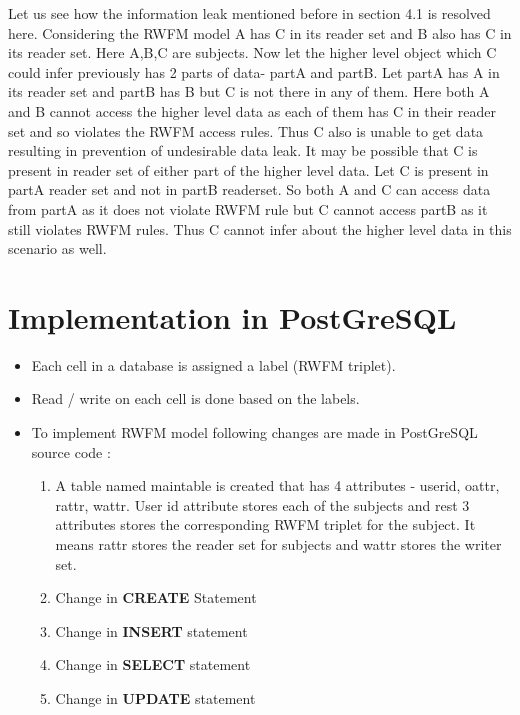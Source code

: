 \documentclass[11pt,a4paper]{report}
\begin{document}
Let us see how the information leak mentioned before in section 4.1 is resolved here. Considering the RWFM model A has C in its reader set and B also has C in its reader set. Here A,B,C are subjects. Now let the higher level object which C could infer previously has 2 parts of data- partA and partB. Let partA has A in its reader set and partB has B but C is not there in any of them. Here both A and B cannot access the higher level data as each of them has C in their reader set and so violates the RWFM access rules. Thus C also is unable to get data resulting in prevention of undesirable data leak. It may be possible that C is present in reader set of either part of the higher level data. Let C is present in partA reader set and not in partB readerset. So both A and C can access data from partA as it does not violate RWFM rule but C cannot access partB as it still violates RWFM rules. Thus C cannot infer about the higher level data in this scenario as well.
    

\section{Implementation in PostGreSQL}
\begin{itemize}
    \item Each cell in a database is assigned a label (RWFM triplet).
    \item Read / write on each cell is done based on the labels.
    \item To implement RWFM model following changes are made in PostGreSQL source code :
    \begin{enumerate}
        \item A table named main\textunderscore table is created that has 4 attributes - user\textunderscore id, o\textunderscore attr, r\textunderscore attr, w\textunderscore attr. User \textunderscore id attribute stores each of the subjects and rest 3 attributes stores the corresponding RWFM triplet for the subject. It means r\textunderscore attr stores the reader set for subjects and w\textunderscore attr stores the writer set. 
        \item Change in \textbf{CREATE} Statement 
        \item Change in \textbf{INSERT} statement
        \item Change in \textbf{SELECT} statement
        \item Change in \textbf{UPDATE} statement
    \end{enumerate}
\end{itemize}
\end{document}
